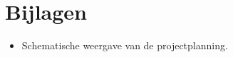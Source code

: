 \documentclass[a4paper,oneside,11pt,final]{memoir}
\begin{document}

\section*{Bijlagen} \label{sec:Bijlagen}
\begin{itemize}
\item Schematische weergave van de projectplanning.
\end{itemize}
\end{document}
